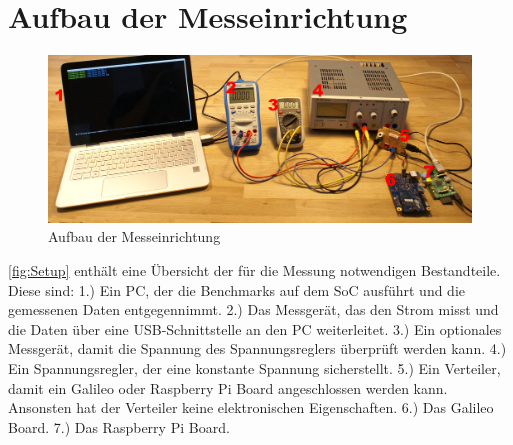 
\section{Aufbau der Messeinrichtung}

\begin{figure}[H]
\centering
\includegraphics[width=1.0\textwidth]{images/setup.jpg}
\caption{Aufbau der Messeinrichtung}
\label{fig:Setup}
\end{figure}

\autoref{fig:Setup} enthält eine Übersicht der für die Messung notwendigen Bestandteile. Diese sind: 1.) Ein PC, der die Benchmarks auf dem SoC ausführt und die gemessenen Daten entgegennimmt. 2.) Das Messgerät, das den Strom misst und die Daten über eine USB-Schnittstelle an den PC weiterleitet. 3.) Ein optionales Messgerät, damit die Spannung des Spannungsreglers überprüft werden kann. 4.) Ein Spannungsregler, der eine konstante Spannung sicherstellt. 5.) Ein Verteiler, damit ein Galileo oder Raspberry Pi Board angeschlossen werden kann. Ansonsten hat der Verteiler keine elektronischen Eigenschaften. 6.) Das Galileo Board. 7.) Das Raspberry Pi Board.

